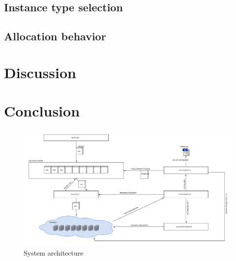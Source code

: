 \documentclass[a4paper]{IEEEtran}
\begin{document}
\subsection{Instance type selection}

\subsection{Allocation behavior}

\section{Discussion}

\section{Conclusion}

\begin{thebibliography}{9}

\end{thebibliography}


\newpage

\begin{landscape}
\appendix

\begin{figure}[h]
\centering
\includegraphics[width=770pt]{"System Architecture 2"}
\caption{System architecture}
\label{fig_sysarch}
\end{figure}
\end{landscape}
\clearpage
\end{document}
